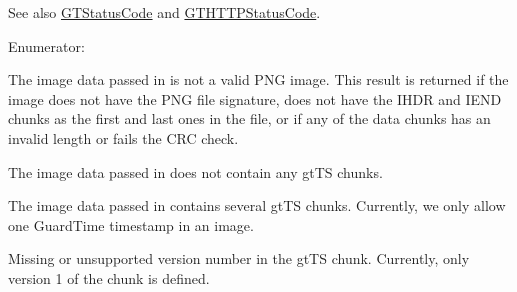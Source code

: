 \begin{DoxySeeAlso}{See also}
\hyperlink{group__common_ga43b0c0f44bcf02caf0c2866b1f647a35}{GTStatusCode} and \hyperlink{group__http_ga9f42032eb2905e40ee6fe84e0dfc03c2}{GTHTTPStatusCode}. 
\end{DoxySeeAlso}
\begin{Desc}
\item[Enumerator: ]\par
\begin{description}
\item[{\em 
\hypertarget{group__png_gga70021c722b39d6b5945e9dd65b5d3b77a39011e68decc1c79ddc0424d9e42d581}{
GTPNG\_\-BAD\_\-DATA}
\label{group__png_gga70021c722b39d6b5945e9dd65b5d3b77a39011e68decc1c79ddc0424d9e42d581}
}]The image data passed in is not a valid PNG image. This result is returned if the image does not have the PNG file signature, does not have the IHDR and IEND chunks as the first and last ones in the file, or if any of the data chunks has an invalid length or fails the CRC check. \item[{\em 
\hypertarget{group__png_gga70021c722b39d6b5945e9dd65b5d3b77ae3e19c689f17d7a2ea6e13f8db297a1d}{
GTPNG\_\-NO\_\-GTTS}
\label{group__png_gga70021c722b39d6b5945e9dd65b5d3b77ae3e19c689f17d7a2ea6e13f8db297a1d}
}]The image data passed in does not contain any {\ttfamily gtTS} chunks. \item[{\em 
\hypertarget{group__png_gga70021c722b39d6b5945e9dd65b5d3b77a20c972dfb42a0a00c24ee1f3382a270e}{
GTPNG\_\-MULTIPLE\_\-GTTS}
\label{group__png_gga70021c722b39d6b5945e9dd65b5d3b77a20c972dfb42a0a00c24ee1f3382a270e}
}]The image data passed in contains several {\ttfamily gtTS} chunks. Currently, we only allow one GuardTime timestamp in an image. \item[{\em 
\hypertarget{group__png_gga70021c722b39d6b5945e9dd65b5d3b77a34a60e01de9485155446af3ee0d2cef6}{
GTPNG\_\-GTTS\_\-VERSION}
\label{group__png_gga70021c722b39d6b5945e9dd65b5d3b77a34a60e01de9485155446af3ee0d2cef6}
}]Missing or unsupported version number in the {\ttfamily gtTS} chunk. Currently, only version 1 of the chunk is defined. \end{description}
\end{Desc}



